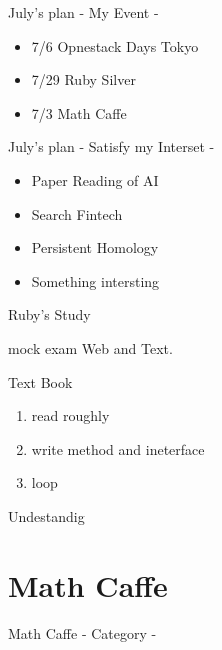 \documentclass[12pt, unicode]{beamer}
\begin{document}
\begin{frame}{July's plan - My Event -}
 \begin{itemize}
  \item 7/6 Opnestack Days Tokyo
  \item 7/29 Ruby Silver
  \item 7/3 Math Caffe
 \end{itemize}
\end{frame}

\begin{frame}{July's plan - Satisfy my Interset -}
\begin{itemize}
  \item Paper Reading of AI
  \item Search Fintech
  \item Persistent Homology
  \item Something intersting
\end{itemize}
\end{frame}


\begin{frame}{Ruby's Study}
  \begin{block}{mock exam}
    Web and Text.
  \end{block}
  \begin{block}{Text Book}
     \begin{enumerate}
       \item read roughly
       \item write method and ineterface
       \item loop
     \end{enumerate}
\end{block}
\end{frame}

\begin{frame}{Undestandig}

\end{frame}

\section{Math Caffe}

\begin{frame}{Math Caffe - Category -}
  
\end{frame}
\end{document}
